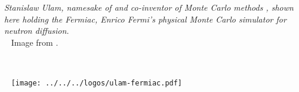 \vfill
\begin{center}
\hfill
\begin{minipage}[b]{2in}
  \footnotesize {\it Stanislaw Ulam, namesake of \Stan and co-inventor
    of Monte Carlo methods \citep{MetropolisUlam:1949}, shown here
    holding the Fermiac, Enrico Fermi's physical Monte Carlo simulator
    for neutron diffusion.}
  \\[3pt] \mbox{ } \hfill
  {\scriptsize Image from \citep{Giesler:2000}.}
\end{minipage} \ \ \ \ \ 
\begin{minipage}[b]{1.5in} \mbox{ } \hfill
  \texttt{[image: ../../../logos/ulam-fermiac.pdf]}
\end{minipage} 
\end{center}
